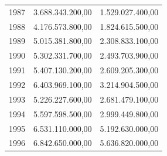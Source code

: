 \documentclass[a4paper,openright,12pt]{book}
\begin{document}
\begin{table}[]
\begin{tabular}{@{}lrr@{}}
1987 & 3.688.343.200,00                                                                                                      & 1.529.027.400,00                                                                                                      \\
1988 & 4.176.573.800,00                                                                                                      & 1.824.615.500,00                                                                                                      \\
1989 & 5.015.381.800,00                                                                                                      & 2.308.833.100,00                                                                                                      \\
1990 & 5.302.331.700,00                                                                                                      & 2.493.703.900,00                                                                                                      \\
1991 & 5.407.130.200,00                                                                                                      & 2.609.205.300,00                                                                                                      \\
1992 & 6.403.969.100,00                                                                                                      & 3.214.904.500,00                                                                                                      \\
1993 & 5.226.227.600,00                                                                                                      & 2.681.479.100,00                                                                                                      \\
1994 & 5.597.598.500,00                                                                                                      & 2.999.449.800,00                                                                                                      \\
1995 & 6.531.110.000,00                                                                                                      & 5.192.630.000,00                                                                                                      \\
1996 & 6.842.650.000,00                                                                                                      & 5.636.820.000,00                                                                                                      \\

\end{tabular}
\end{table}
\end{document}
